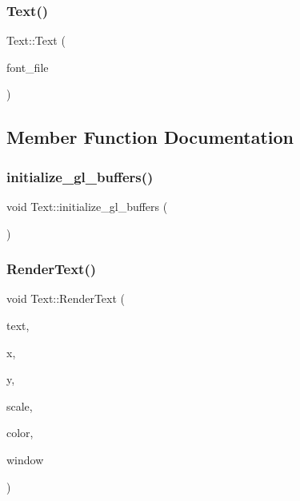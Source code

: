 \subsubsection{\texorpdfstring{Text()}{Text()}}
{\footnotesize\ttfamily Text\+::\+Text (\begin{DoxyParamCaption}\item[{const std\+::string \&}]{font\+\_\+file }\end{DoxyParamCaption})\hspace{0.3cm}{\ttfamily [inline]}}



\subsection{Member Function Documentation}
\mbox{\label{classText_a8e38585b2e2f824a97895f3ca743372c}} 
\subsubsection{\texorpdfstring{initialize\+\_\+gl\+\_\+buffers()}{initialize\_gl\_buffers()}}
{\footnotesize\ttfamily void Text\+::initialize\+\_\+gl\+\_\+buffers (\begin{DoxyParamCaption}{ }\end{DoxyParamCaption})\hspace{0.3cm}{\ttfamily [inline]}}

\mbox{\label{classText_ae5fe3bc91282c8a70253af9baf904b22}} 
\subsubsection{\texorpdfstring{Render\+Text()}{RenderText()}}
{\footnotesize\ttfamily void Text\+::\+Render\+Text (\begin{DoxyParamCaption}\item[{std\+::string}]{text,  }\item[{G\+Lfloat}]{x,  }\item[{G\+Lfloat}]{y,  }\item[{G\+Lfloat}]{scale,  }\item[{glm \+::vec3}]{color,  }\item[{G\+L\+F\+Wwindow $\ast$}]{window }\end{DoxyParamCaption})\hspace{0.3cm}{\ttfamily [inline]}}


